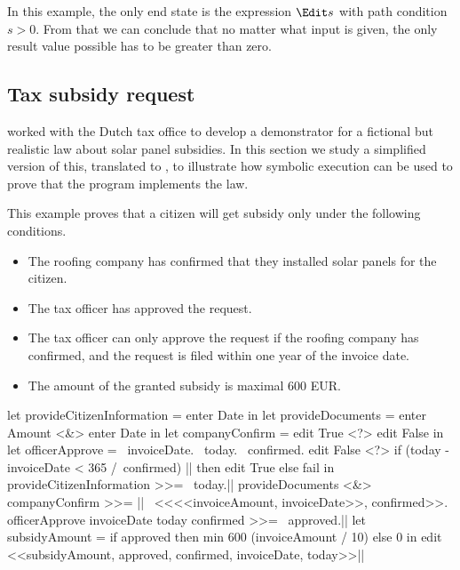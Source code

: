In this example, the only end state is the expression $\Edit s$ with path condition $s > 0$.
From that we can conclude that no matter what input is given, the only result value possible has to be greater than zero.



\subsection{Tax subsidy request}

\citet{conf/sfp/StutterheimAP17} worked with the Dutch tax office to develop a demonstrator for a fictional but realistic law about solar panel subsidies.
In this section we study a simplified version of this, translated to \TOPHAT, to illustrate how symbolic execution can be used to prove that the program implements the law.

This example proves that a citizen will get subsidy only under the following conditions.
\begin{itemize}
\item The roofing company has confirmed that they installed solar panels for the citizen.
\item The tax officer has approved the request.
\item The tax officer can only approve the request if the roofing company has confirmed, and the request is filed within one year of the invoice date.
\item The amount of the granted subsidy is maximal 600 EUR.
\end{itemize}

\begin{TASK}[float=h
            ,numbers=right
            ,caption=Subsidy request and approval workflow at the Dutch tax office.
            ,label=lst:tax
            ]
  let provideCitizenInformation = enter Date in
  let provideDocuments = enter Amount <&> enter Date in
  let companyConfirm = edit True <?> edit False in
  let officerApprove = \ invoiceDate. \ today. \ confirmed.
    edit False <?> if (today - invoiceDate < 365 /\ confirmed) |\label{lst:tax:officer-approve-def}|
      then edit True
      else fail in
  provideCitizenInformation >>= \ today.|\label{lst:tax:citizen-info}|
  provideDocuments <&> companyConfirm >>= |\label{lst:tax:documents-and-company-confirm}|
    \ <<<<invoiceAmount, invoiceDate>>, confirmed>>.
  officerApprove invoiceDate today confirmed >>= \ approved.|\label{lst:tax:officer-approve}|
  let subsidyAmount = if approved
    then min 600 (invoiceAmount / 10) else 0 in
  edit <<subsidyAmount, approved, confirmed, invoiceDate, today>>|\label{lst:tax:result}|
\end{TASK}

